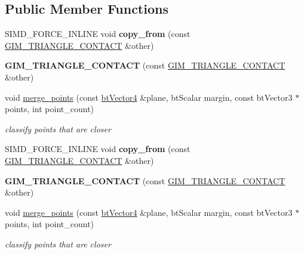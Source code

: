\subsection*{Public Member Functions}
\begin{DoxyCompactItemize}
\item 
\mbox{\label{structGIM__TRIANGLE__CONTACT_a6f754844cd1c761a9786db64024a511c}} 
S\+I\+M\+D\+\_\+\+F\+O\+R\+C\+E\+\_\+\+I\+N\+L\+I\+NE void {\bfseries copy\+\_\+from} (const \hyperlink{structGIM__TRIANGLE__CONTACT}{G\+I\+M\+\_\+\+T\+R\+I\+A\+N\+G\+L\+E\+\_\+\+C\+O\+N\+T\+A\+CT} \&other)
\item 
\mbox{\label{structGIM__TRIANGLE__CONTACT_a8c551224af6537389660884a38073d1c}} 
{\bfseries G\+I\+M\+\_\+\+T\+R\+I\+A\+N\+G\+L\+E\+\_\+\+C\+O\+N\+T\+A\+CT} (const \hyperlink{structGIM__TRIANGLE__CONTACT}{G\+I\+M\+\_\+\+T\+R\+I\+A\+N\+G\+L\+E\+\_\+\+C\+O\+N\+T\+A\+CT} \&other)
\item 
\mbox{\label{structGIM__TRIANGLE__CONTACT_ac506be6f6fe6cb2f37b2890669f69266}} 
void \hyperlink{structGIM__TRIANGLE__CONTACT_ac506be6f6fe6cb2f37b2890669f69266}{merge\+\_\+points} (const \hyperlink{classbtVector4}{bt\+Vector4} \&plane, bt\+Scalar margin, const bt\+Vector3 $\ast$points, int point\+\_\+count)
\begin{DoxyCompactList}\small\item\em classify points that are closer \end{DoxyCompactList}\item 
\mbox{\label{structGIM__TRIANGLE__CONTACT_a6f754844cd1c761a9786db64024a511c}} 
S\+I\+M\+D\+\_\+\+F\+O\+R\+C\+E\+\_\+\+I\+N\+L\+I\+NE void {\bfseries copy\+\_\+from} (const \hyperlink{structGIM__TRIANGLE__CONTACT}{G\+I\+M\+\_\+\+T\+R\+I\+A\+N\+G\+L\+E\+\_\+\+C\+O\+N\+T\+A\+CT} \&other)
\item 
\mbox{\label{structGIM__TRIANGLE__CONTACT_a8c551224af6537389660884a38073d1c}} 
{\bfseries G\+I\+M\+\_\+\+T\+R\+I\+A\+N\+G\+L\+E\+\_\+\+C\+O\+N\+T\+A\+CT} (const \hyperlink{structGIM__TRIANGLE__CONTACT}{G\+I\+M\+\_\+\+T\+R\+I\+A\+N\+G\+L\+E\+\_\+\+C\+O\+N\+T\+A\+CT} \&other)
\item 
\mbox{\label{structGIM__TRIANGLE__CONTACT_ac506be6f6fe6cb2f37b2890669f69266}} 
void \hyperlink{structGIM__TRIANGLE__CONTACT_ac506be6f6fe6cb2f37b2890669f69266}{merge\+\_\+points} (const \hyperlink{classbtVector4}{bt\+Vector4} \&plane, bt\+Scalar margin, const bt\+Vector3 $\ast$points, int point\+\_\+count)
\begin{DoxyCompactList}\small\item\em classify points that are closer \end{DoxyCompactList}\end{DoxyCompactItemize}
